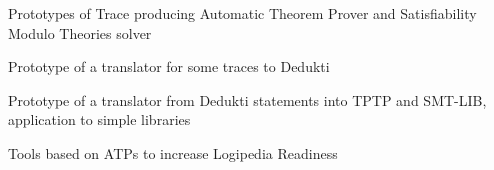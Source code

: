 \begin{workpackage}






\begin{wpdelivs}
  \begin{wpdeliv}[due=6,id=ATPtrace1,dissem=PU,nature=DEM,lead=Lie]
    {Prototypes of Trace producing Automatic Theorem Prover and Satisfiability Modulo Theories solver}
  \end{wpdeliv}

  \begin{wpdeliv}[due=18,id=Trace2Dedukti1,dissem=PU,nature=DEM,lead=Imt]
    {Prototype of a translator for some traces to Dedukti}
  \end{wpdeliv}

  \begin{wpdeliv}[due=24,id=Dedukti2ATP1,dissem=PU,nature=DEM,lead=Sac]
    {Prototype of a translator from Dedukti statements into TPTP and
      SMT-LIB, application to simple libraries}
  \end{wpdeliv}

  \begin{wpdeliv}[due=36,id=ReadinessCode,dissem=PU,nature=DEM,lead=Sac]
    {Tools based on ATPs to increase Logipedia Readiness}
  \end{wpdeliv}


\end{wpdelivs}
\end{workpackage}
